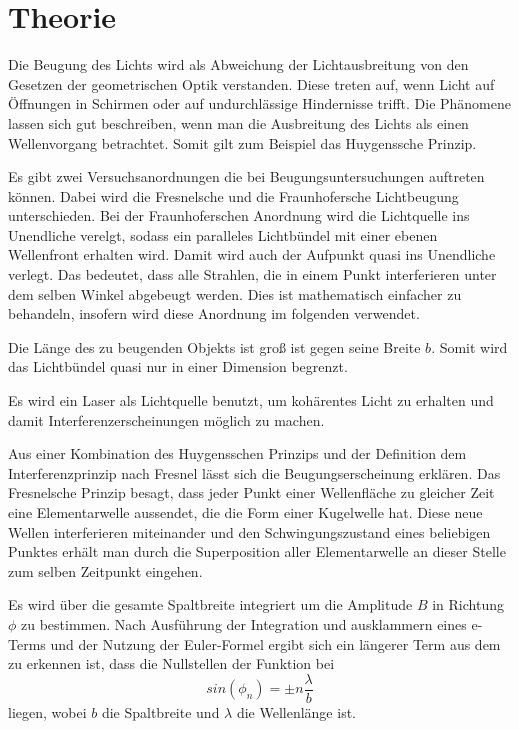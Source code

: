 \section{Theorie}
\label{sec:Theorie}

Die Beugung des Lichts wird als Abweichung der Lichtausbreitung von den Gesetzen der geometrischen Optik verstanden. Diese treten auf, wenn Licht auf Öffnungen in Schirmen oder auf undurchlässige Hindernisse trifft. Die Phänomene lassen sich gut beschreiben, wenn man die Ausbreitung des Lichts als einen Wellenvorgang betrachtet. 
Somit gilt zum Beispiel das Huygenssche Prinzip. 

Es gibt zwei Versuchsanordnungen die bei Beugungsuntersuchungen auftreten können. Dabei wird die Fresnelsche und die Fraunhofersche Lichtbeugung unterschieden. Bei der Fraunhoferschen Anordnung wird die Lichtquelle ins Unendliche verelgt, sodass ein paralleles Lichtbündel mit einer ebenen Wellenfront erhalten wird. Damit wird auch der Aufpunkt quasi ins Unendliche  verlegt. Das bedeutet, dass alle Strahlen, die in einem Punkt interferieren unter dem selben Winkel abgebeugt werden. Dies ist mathematisch einfacher zu behandeln, insofern wird diese Anordnung im folgenden verwendet. 

Die Länge des zu beugenden Objekts ist groß ist gegen seine Breite $b$. Somit wird das Lichtbündel quasi nur in einer Dimension begrenzt. 

Es wird ein Laser als Lichtquelle benutzt, um kohärentes Licht zu erhalten und damit Interferenzerscheinungen möglich zu machen. 

Aus einer Kombination des Huygensschen Prinzips und der Definition dem Interferenzprinzip nach Fresnel lässt sich die Beugungserscheinung erklären. Das Fresnelsche Prinzip besagt, dass jeder Punkt einer Wellenfläche zu gleicher Zeit eine Elementarwelle aussendet, die die Form einer Kugelwelle hat. Diese neue Wellen interferieren miteinander und den Schwingungszustand eines beliebigen Punktes erhält man durch die Superposition aller Elementarwelle an dieser Stelle zum selben Zeitpunkt eingehen. 

Es wird über die gesamte Spaltbreite integriert um die Amplitude $B$ in Richtung $\phi$ zu bestimmen. Nach Ausführung der Integration und ausklammern eines e-Terms und der Nutzung der Euler-Formel ergibt sich ein längerer Term aus dem zu erkennen ist, dass die Nullstellen der Funktion bei 
\begin{equation} 
sin(\phi_n)= \pm n \frac{\lambda}{b}
\label{eqn:nullstellen}
\end{equation} liegen, wobei $b$ die Spaltbreite und $\lambda$ die Wellenlänge ist. 

